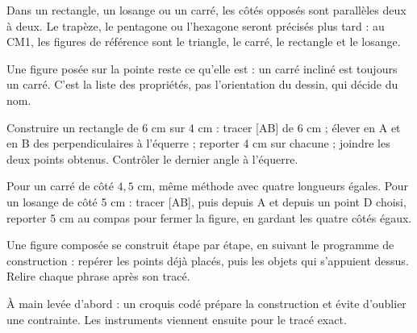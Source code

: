 \begin{propriete}Dans un rectangle, un losange ou un carré, les côtés opposés sont parallèles deux à deux. Le trapèze, le pentagone ou l’hexagone seront précisés plus tard : au CM1, les figures de référence sont le triangle, le carré, le rectangle et le losange.\end{propriete}
\begin{attention}Une figure posée sur la pointe reste ce qu’elle est : un carré incliné est toujours un carré. C’est la liste des propriétés, pas l’orientation du dessin, qui décide du nom.\end{attention}
\clearpage
{}\label{cours-16-4}
\begin{savoirfaire}Construire un rectangle de 6 cm sur 4 cm : tracer [AB] de 6 cm ; élever en A et en B des perpendiculaires à l’équerre ; reporter 4 cm sur chacune ; joindre les deux points obtenus. Contrôler le dernier angle à l’équerre.\end{savoirfaire}
\begin{exemple}Pour un carré de côté $4{,}5$ cm, même méthode avec quatre longueurs égales. Pour un losange de côté 5 cm : tracer [AB], puis depuis A et depuis un point D choisi, reporter 5 cm au compas pour fermer la figure, en gardant les quatre côtés égaux.\end{exemple}
\begin{savoirfaire}Une figure composée se construit étape par étape, en suivant le programme de construction : repérer les points déjà placés, puis les objets qui s’appuient dessus. Relire chaque phrase après son tracé.\end{savoirfaire}
\begin{attention}À main levée d’abord : un croquis codé prépare la construction et évite d’oublier une contrainte. Les instruments viennent ensuite pour le tracé exact.\end{attention}

